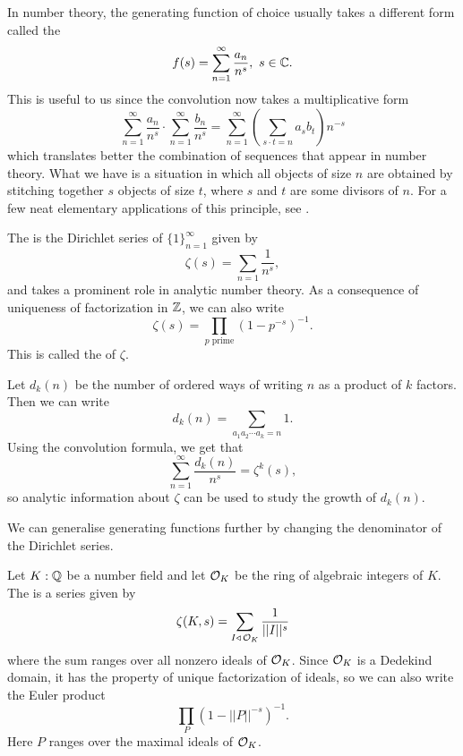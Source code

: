 \documentclass[12pt, a4paper]{report}
\begin{document}
In number theory, the generating function of choice usually takes a different
form called the 
\[f(s) = \sum\limits_{n=1}^\infty\frac{a_n}{n^s}, \,\, s \in {\mathbb C}. \]
This is useful to us since the convolution now takes a multiplicative form
\[\sum\limits_{n=1}^\infty\frac{a_n}{n^s} \cdot
  \sum\limits_{n=1}^\infty\frac{b_n}{n^s} =
  \sum\limits_{n=1}^\infty \left( \sum\limits_{s \cdot t = n} a_sb_t \right) n^{-s}\]
which translates better the combination of sequences that appear in number
theory. What we have is a situation in which all
objects of size $n$ are obtained by stitching together $s$ objects of size $t$,
where $s$ and $t$ are some divisors of $n$.
For a few neat elementary applications of this principle, see \cite[Section 2.6, pages 59-68]{wilf}.

\begin{example}
  The  is the Dirichlet series of
  $\{1\}_{n=1}^\infty$ given by
  \[\zeta(s) = \sum\limits_{n=1} \frac{1}{n^s},\]
  and takes a prominent role in analytic number theory.
  As a consequence of uniqueness of factorization in ${\mathbb Z}$, we can also write
  \[\zeta(s) = \prod\limits_{p \text{ prime}}\left( 1-p^{-s} \right)^{-1}.\]
  This is called the  of $\zeta.$
\end{example}

\begin{example}
  Let $d_k(n)$ be the number of ordered ways of writing $n$ as a product of $k$
  factors. Then we can write
  \[d_k(n) = \sum\limits_{a_1 a_2 \cdots a_k = n} 1.\]
  Using the convolution formula, we get that
  \[\sum\limits_{n=1}^\infty \frac{d_k(n)}{n^s} = \zeta^k(s),\]
  so analytic information about $\zeta$ can be used to study the growth of
  $d_k(n).$
\end{example}

We can generalise generating functions further by changing the denominator of
the Dirichlet series. 

\begin{example}
  Let $K : {\mathbb Q}$ be a number field and let ${\mathcal O}_K$ be the ring of algebraic
  integers of $K$.
  The  is
  a series given by 
  \[\zeta(K,s) = \sum\limits_{I \triangleleft \, {\mathcal O}_K} \frac{1}{||I||^s} \]
  where the sum ranges over all nonzero ideals of ${\mathcal O}_K$.
  Since ${\mathcal O}_K$ is a Dedekind domain, it has the property of unique
  factorization of ideals, so we can also write the Euler product
  \[\prod\limits_P \left( 1-||P||^{-s} \right)^{-1}.\]
  Here $P$ ranges over the maximal ideals of ${\mathcal O}_K$. 
\end{example}
\end{document}

